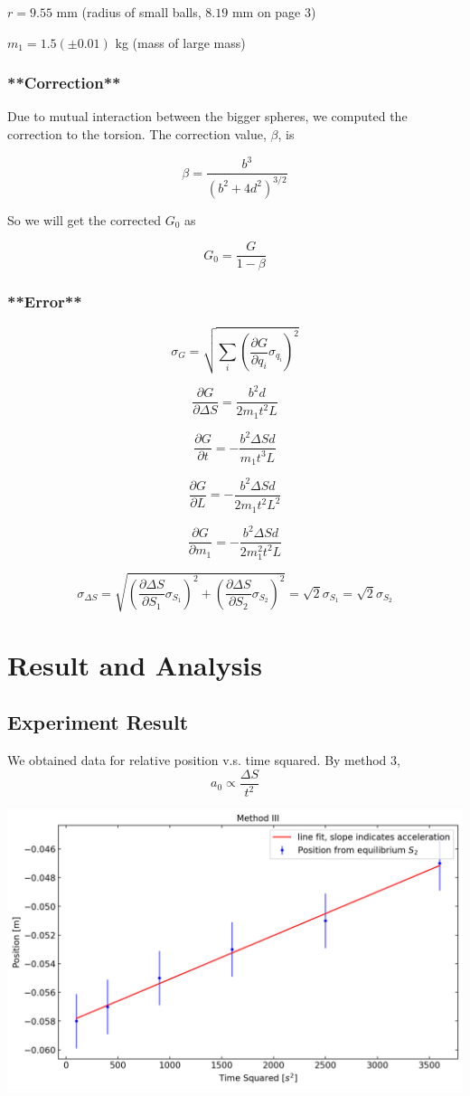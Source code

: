 \documentclass[a4paper]{tufte-handout}
\begin{document}
$r = 9.55 $ mm (radius of small balls, $8.19$ mm on page 3)

$m_1 = 1.5 (\pm 0.01)$ kg (mass of large mass)


\subsubsection{**Correction**}

Due to mutual interaction between the bigger spheres, we computed the correction to the torsion. The correction value, $\beta$, is

$$ \beta = \frac{b^3}{(b^2 + 4d^2)^{3/2}} $$

So we will get the corrected $G_0$ as

$$ G_0 = \frac{G}{1 - \beta } $$




\subsubsection{**Error**}
$$\sigma_G = \sqrt{\sum _i \left(\frac{\partial G}{\partial q_i}\sigma_{q_i}\right)^2}$$

$$\frac{\partial G}{\partial \Delta S} = \frac{b^2 d}{2 m_1 t^2 L}$$

$$\frac{\partial G}{\partial t} = -\frac{b^2 \Delta S d}{m_1 t^3 L}$$

$$\frac{\partial G}{\partial L} = -\frac{b^2 \Delta S d}{2 m_1 t^2 L^2}$$

$$\frac{\partial G}{\partial m_1} = -\frac{b^2 \Delta S d}{2 m_1^2 t^2 L}$$



$$\sigma_{\Delta S} = \sqrt{\left(\frac{\partial\Delta S}{\partial S_1}\sigma_{S_1}\right)^2+\left(\frac{\partial\Delta S}{\partial S_2}\sigma_{S_2}\right)^2}=\sqrt{2}\sigma_{S_1}=\sqrt{2}\sigma_{S_2}$$


\newpage
\section{Result and Analysis}
\subsection{Experiment Result}
We obtained data for relative position v.s. time squared. By method 3,
$$a_0\propto \frac{\Delta S}{t^2}$$

\includegraphics[width= 1 \linewidth]{figures/fit_m3.png}
\end{document}
